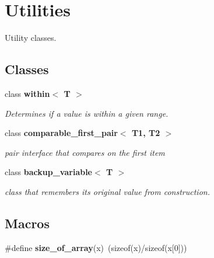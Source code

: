 \section{Utilities}
\label{group___utilities}


Utility classes.  


\subsection*{Classes}
\begin{DoxyCompactItemize}
\item 
class {\bf within$<$ T $>$}
\begin{DoxyCompactList}\small\item\em Determines if a value is within a given range. \end{DoxyCompactList}\item 
class {\bf comparable\+\_\+first\+\_\+pair$<$ T1, T2 $>$}
\begin{DoxyCompactList}\small\item\em pair interface that compares on the first item \end{DoxyCompactList}\item 
class {\bf backup\+\_\+variable$<$ T $>$}
\begin{DoxyCompactList}\small\item\em class that remembers its original value from construction. \end{DoxyCompactList}\end{DoxyCompactItemize}
\subsection*{Macros}
\begin{DoxyCompactItemize}
\item 
\#define {\bf size\+\_\+of\+\_\+array}(x)~(sizeof(x)/sizeof(x[0]))
\end{DoxyCompactItemize}
